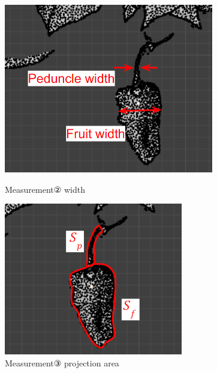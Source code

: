 \begin{figure}[H]
  \begin{minipage}[b]{0.48\columnwidth}
    \centering
    \includegraphics[width=\columnwidth]{images/png/measurement2.png}
    \caption{Measurement② width}
    \label{Fig:measurement2}
  \end{minipage}
  \hspace{0.04\columnwidth}
  \begin{minipage}[b]{0.48\columnwidth}
    \centering
    \includegraphics[width=\columnwidth]{images/png/measurement3.png}
    \caption{Measurement③ projection area}
    \label{Fig:measurement3}
  \end{minipage}
\end{figure}